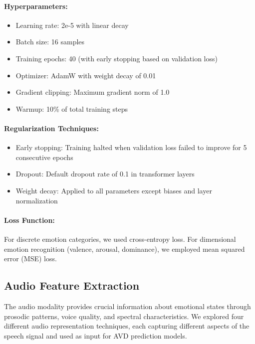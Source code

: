 \documentclass[12pt]{article}
\begin{document}
\paragraph{Hyperparameters:}
\begin{itemize}
    \item Learning rate: 2e-5 with linear decay
    \item Batch size: 16 samples
    \item Training epochs: 40 (with early stopping based on validation loss)
    \item Optimizer: AdamW with weight decay of 0.01
    \item Gradient clipping: Maximum gradient norm of 1.0
    \item Warmup: 10\% of total training steps
\end{itemize}

\paragraph{Regularization Techniques:}
\begin{itemize}
    \item Early stopping: Training halted when validation loss failed to improve for 5 consecutive epochs
    \item Dropout: Default dropout rate of 0.1 in transformer layers
    \item Weight decay: Applied to all parameters except biases and layer normalization
\end{itemize}

\paragraph{Loss Function:}
For discrete emotion categories, we used cross-entropy loss. For dimensional emotion recognition (valence, arousal, dominance), we employed mean squared error (MSE) loss.

\subsection{Audio Feature Extraction}
The audio modality provides crucial information about emotional states through prosodic patterns, voice quality, and spectral characteristics. We explored four different audio representation techniques, each capturing different aspects of the speech signal and used as input for AVD prediction models.
\end{document}
